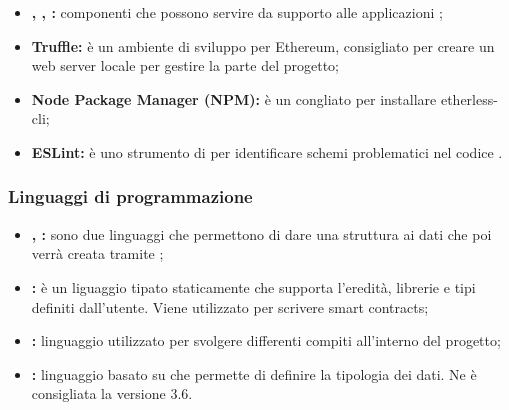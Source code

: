 \begin{itemize}
    		 	\item \textbf{, , : }componenti che possono servire da supporto alle applicazioni ;
    		 	\item \textbf{Truffle: }è un ambiente di sviluppo per Ethereum, consigliato per creare un web server locale per gestire la parte  del progetto;
    		 	\item \textbf{Node Package Manager (NPM): }è un  congliato per installare etherless-cli;
    			\item \textbf{ESLint: }è uno strumento di  per identificare schemi problematici nel codice .

		\end{itemize}
	\subsubsection{Linguaggi di programmazione}
        	\begin{itemize}
        		\item \textbf{, : }sono due linguaggi che permettono di dare una struttura ai dati che poi verrà creata tramite ;
        		\item \textbf{: }è un liguaggio tipato staticamente che supporta l'eredità, librerie e tipi definiti dall'utente. Viene utilizzato per scrivere smart contracts;
        		\item \textbf{: }linguaggio utilizzato per svolgere differenti compiti all'interno del progetto;
        		\item \textbf{: }linguaggio basato su  che permette di definire la tipologia dei dati. Ne è consigliata la versione 3.6.
        \end{itemize}

